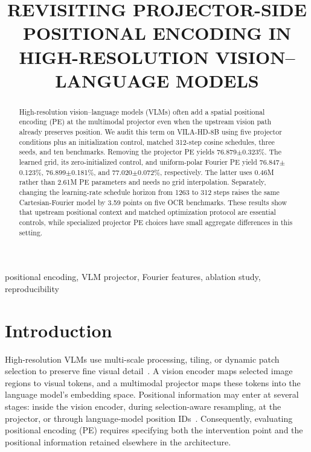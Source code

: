 \documentclass{article}
\title{REVISITING PROJECTOR-SIDE POSITIONAL ENCODING IN
       HIGH-RESOLUTION VISION--LANGUAGE MODELS}
\begin{document}
\maketitle

\begin{abstract}
High-resolution vision--language models (VLMs) often add a
spatial positional encoding (PE) at the multimodal projector
even when the upstream vision path already preserves position.
We audit this term on VILA-HD-8B using five projector
conditions plus an initialization control, matched 312-step
cosine schedules, three seeds, and ten benchmarks.
Removing the projector PE yields 76.879$\pm$0.323\%.
The learned grid, its zero-initialized control, and uniform-polar
Fourier PE yield 76.847$\pm$0.123\%, 76.899$\pm$0.181\%, and
77.020$\pm$0.072\%, respectively.
The latter uses 0.46M rather than 2.61M PE parameters and needs
no grid interpolation. Separately, changing the learning-rate schedule horizon
from 1263 to 312 steps raises the same Cartesian-Fourier model
by 3.59 points on five OCR benchmarks. These results show that
upstream positional context and matched optimization protocol
are essential controls, while specialized projector PE choices
have small aggregate differences in this setting.
\end{abstract}
\begin{keywords}
positional encoding, VLM projector, Fourier features, ablation study, reproducibility
\end{keywords}

\section{Introduction}

High-resolution VLMs use multi-scale processing, tiling, or
dynamic patch selection to preserve fine visual
detail~\cite{ps3,internvl,llava_hd}. A
vision encoder maps selected image regions to visual tokens,
and a multimodal projector maps these tokens into the language
model's embedding space. Positional information may enter at several stages: inside the
vision encoder, during selection-aware resampling, at the
projector, or through language-model position
IDs~\cite{ps3,mrope,v2pe}. Consequently, evaluating positional
encoding (PE) requires specifying both the intervention point
and the positional information retained elsewhere in the
architecture.
\end{document}

